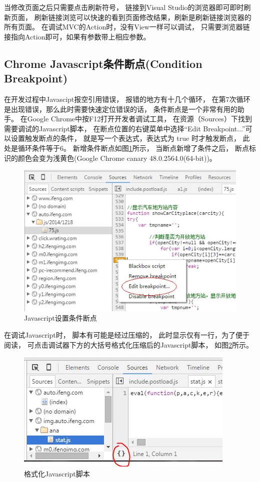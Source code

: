 \documentclass{book}
\begin{document}
当修改页面之后只需要点击刷新符号，
链接到Visual Studio的浏览器即可即时刷新页面，
刷新链接浏览可以快速的看到页面修改结果，刷新是刷新链接浏览器的所有页面。
在调试MVC的Action时，没有View一样可以调试，
只需要浏览器链接指向Action即可，如果有参数带上相应参数。


\subsection{Chrome Javascript条件断点(Condition Breakpoint)}

在开发过程中Javascipt报空引用错误，
报错的地方有十几个循环，
在第7次循环是出现错误，那么此时需要快速定位错误的话，
条件断点是一个非常有用的助手。
在Google Chrome中按F12打开开发者调试工具，
在资源（Sources）下找到需要调试的Javascript脚本，
在断点位置的右键菜单中选择“Edit Breakpoint...”可以设置触发断点的条件，
就是写一个表达式，表达式为 true 时才触发断点，
此处是循环条件等于6。
新增条件断点如图\ref{fig:ConditionBreakpoints}所示，
当断点新增了条件之后，
断点标识的颜色会变为浅黄色(Google Chrome canary 48.0.2564.0(64-bit))。

\begin{figure}[htbp]
	\centering
	\includegraphics[scale=0.8]{ConditionBreakpoints.jpg}
	\caption{Javascript设置条件断点}
	\label{fig:ConditionBreakpoints}
\end{figure}

在调试Javascript时，
脚本有可能是经过压缩的，
此时显示仅有一行，为了便于阅读，
可点击调试器下方的大括号格式化压缩后的Javascript脚本，
如图\ref{fig:FormatZippedJavascript}所示。

\begin{figure}[htbp]
	\centering
	\includegraphics[scale=0.8]{FormatZippedJavascript.jpg}
	\caption{格式化Javascript脚本}
	\label{fig:FormatZippedJavascript}
\end{figure}
\end{document}
